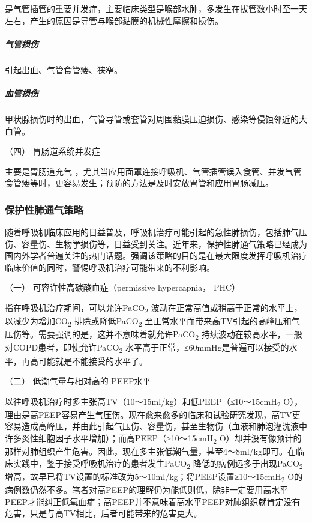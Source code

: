 是气管插管的重要并发症，主要临床类型是喉部水肿，多发生在拔管数小时至一天左右，产生的原因是导管与喉部黏膜的机械性摩擦和损伤。

\subparagraph{气管损伤}

引起出血、气管食管瘘、狭窄。

\subparagraph{血管损伤}

甲状腺损伤时的出血，气管导管或套管对周围黏膜压迫损伤、感染等侵蚀邻近的大血管。

\hypertarget{text00371.htmlux5cux23CHP16-3-5-4-4}{}
（四） 胃肠道系统并发症

主要是胃肠道充气
，尤其当应用面罩连接呼吸机、气管插管误入食管、并发气管食管瘘等时，更容易发生；预防的方法是及时安放胃管和应用胃肠减压。

\subsubsection{保护性肺通气策略}

随着呼吸机临床应用的日益普及，呼吸机治疗可能引起的急性肺损伤，包括肺气压伤、容量伤、生物学损伤等，日益受到关注。近年来，保护性肺通气策略已经成为国内外学者普遍关注的热门话题。强调该策略的目的是在最大限度发挥呼吸机治疗临床价值的同时，警惕呼吸机治疗可能带来的不利影响。

\hypertarget{text00371.htmlux5cux23CHP16-3-5-5-1}{}
（一） 可容许性高碳酸血症（permissive hypercapnia， PHC）

指在呼吸机治疗期间，可以允许PaCO\textsubscript{2}
波动在正常高值或稍高于正常的水平上，以减少为增加CO\textsubscript{2}
排除或降低PaCO\textsubscript{2}
至正常水平而带来高TV引起的高峰压和气压伤等。需要强调的是，这并不意味着就允许PaCO\textsubscript{2}
持续波动在较高水平，一般对COPD患者，即使允许PaCO\textsubscript{2}
水平高于正常，≤60mmHg是普遍可以接受的水平，再高可能就是不能接受的水平了。

\hypertarget{text00371.htmlux5cux23CHP16-3-5-5-2}{}
（二） 低潮气量与相对高的 PEEP水平

以往呼吸机治疗时多主张高TV（10～15ml/kg）和低PEEP（≤10～15cmH\textsubscript{2}
O），理由是高PEEP容易产生气压伤。现在愈来愈多的临床和试验研究发现，高TV更容易造成高峰压，并由此引起气压伤、容量伤，甚至生物伤（血液和肺泡灌洗液中许多炎性细胞因子水平增加）；而高PEEP（≥10～15cmH\textsubscript{2}
O）却并没有像预计的那样对肺组织产生危害。因此，现在多主张低潮气量，甚至4～8ml/kg即可。在临床实践中，鉴于接受呼吸机治疗的患者发生PaCO\textsubscript{2}
降低的病例远多于出现PaCO\textsubscript{2}
增高，故早已将TV设置的标准改为5～10ml/kg；将PEEP设置≥10～15cmH\textsubscript{2}
O的病例数仍然不多。笔者对高PEEP的理解仍为能低则低，除非一定要用高水平PEEP才能纠正低氧血症；高PEEP并不意味着高水平PEEP对肺组织就肯定没有危害，只是与高TV相比，后者可能带来的危害更大。

